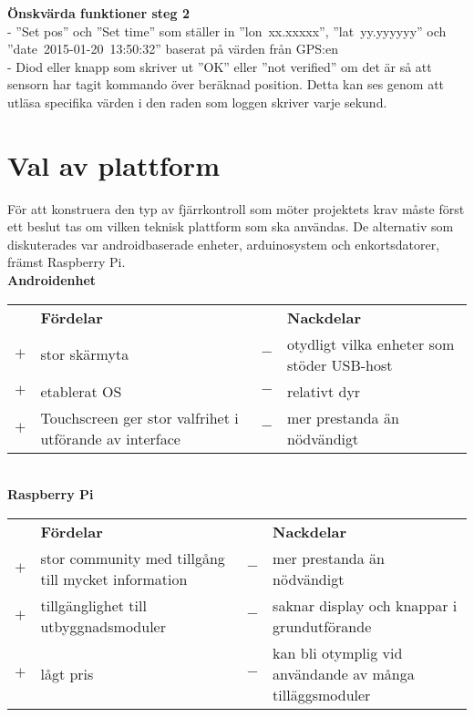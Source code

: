 \documentclass{article}
\begin{document}
			\noindent \textbf{Önskvärda funktioner steg 2} \\
			-	”Set pos” och ”Set time” som ställer in \hbox{''lon xx.xxxxx''}, \hbox{''lat yy.yyyyyy''} och \hbox{''date 2015-01-20 13:50:32''} baserat på värden från GPS:en \\

			\noindent- Diod eller knapp som skriver ut ”OK” eller ”not verified” om det är så att sensorn har tagit kommando över beräknad position. Detta kan ses genom att utläsa specifika värden i den raden som loggen skriver varje sekund.

		\newpage

		\section*{Val av plattform} %
		\label{sec:val_av_plattform}

			För att konstruera den typ av fjärrkontroll som möter projektets krav måste först ett beslut tas om vilken teknisk plattform som ska användas. De alternativ som diskuterades var androidbaserade enheter, arduinosystem och enkortsdatorer, främst Raspberry Pi.\\

			\noindent\textsf{\textbf{Androidenhet}}\\
			\begin{tabularx}{\textwidth}{@{}cXcX}
				& \textbf{Fördelar} 	& & \textbf{Nackdelar} \\
				$+$ & stor skärmyta 	&	$-$ & otydligt vilka enheter som stöder 								USB-host \\
				$+$ &  etablerat OS 	& $-$ & relativt dyr \\
				$+$	&  Touchscreen ger stor valfrihet i utförande av interface				& $-$ & mer prestanda än nödvändigt
			\end{tabularx}\\

				
			\noindent\textsf{\textbf{Raspberry Pi}}\\
			\begin{tabularx}{\textwidth}{@{}cXcX}
				& \textbf{Fördelar} 	& & \textbf{Nackdelar} \\
				$+$ & stor community med tillgång till mycket information & $-$ & mer prestanda än nödvändigt \\
				$+$ & tillgänglighet till utbyggnadsmoduler & $-$ & saknar display och knappar i grundutförande \\
				$+$ & lågt pris&	$-$ & kan bli otymplig vid användande av många tilläggsmoduler \\	
			\end{tabularx}\\
\end{document}
